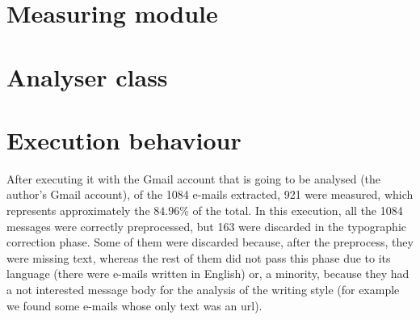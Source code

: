\section{Measuring module} \label{section:measmod}


\section{Analyser class}\label{sect:analyserclass}


\section{Execution behaviour} \label{section:exebehav}
After executing it with the Gmail account that is going to be analysed (the author's Gmail account), of the 1084 e-mails extracted, 921 were measured, which represents approximately the $84.96$\% of the total. In this execution, all the 1084 messages were correctly preprocessed, but 163 were discarded in the typographic correction phase. Some of them were discarded because, after the preprocess, they were missing text, whereas the rest of them did not pass this phase due to its language (there were e-mails written in English) or, a minority, because they had a not interested message body for the analysis of the writing style (for example we found some e-mails whose only text was an url).